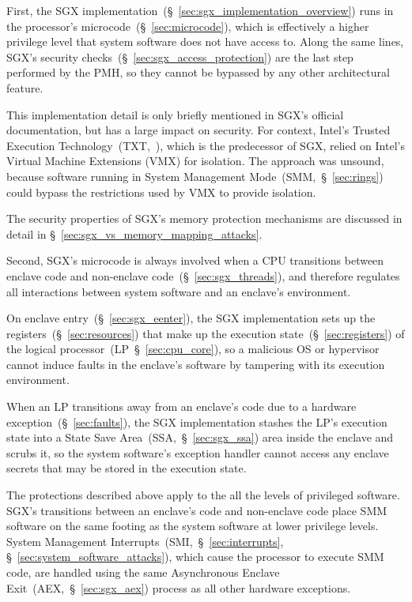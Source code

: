 First, the SGX implementation~(\S~\ref{sec:sgx_implementation_overview}) runs
in the processor's microcode~(\S~\ref{sec:microcode}), which is effectively a
higher privilege level that system software does not have access to.
Along the same lines, SGX's security
checks~(\S~\ref{sec:sgx_access_protection}) are the last step performed by the
PMH, so they cannot be bypassed by any other architectural feature.

This implementation detail is only briefly mentioned in SGX's official
documentation, but has a large impact on security. For context, Intel's Trusted
Execution Technology~(TXT,~\cite{grawrock2009txt}), which is the predecessor of
SGX, relied on Intel's Virtual Machine Extensions (VMX) for isolation. The
approach was unsound, because software running in System Management
Mode~(SMM,~\S~\ref{sec:rings}) could bypass the restrictions used by VMX to
provide isolation.

The security properties of SGX's memory protection mechanisms are discussed
in detail in \S~\ref{sec:sgx_vs_memory_mapping_attacks}.

Second, SGX's microcode is always involved when a CPU transitions between
enclave code and non-enclave code~(\S~\ref{sec:sgx_threads}), and therefore
regulates all interactions between system software and an enclave's
environment.

On enclave entry~(\S~\ref{sec:sgx_eenter}), the SGX implementation sets up the
registers~(\S~\ref{sec:resources}) that make up the execution
state~(\S~\ref{sec:registers}) of the logical
processor~(LP~\S~\ref{sec:cpu_core}), so a malicious OS or hypervisor cannot
induce faults in the enclave's software by tampering with its execution
environment.

When an LP transitions away from an enclave's code due to a
hardware exception~(\S~\ref{sec:faults}), the SGX implementation stashes the
LP's execution state into a State Save Area~(SSA,~\S~\ref{sec:sgx_ssa}) area
inside the enclave and scrubs it, so the system software's exception handler
cannot access any enclave secrets that may be stored in the execution state.

The protections described above apply to the all the levels of privileged
software. SGX's transitions between an enclave's code and non-enclave code
place SMM software on the same footing as the system software at lower
privilege levels. System Management Interrupts~(SMI,~\S~\ref{sec:interrupts},
\S~\ref{sec:system_software_attacks}), which cause the processor to execute
SMM code, are handled using the same Asynchronous Enclave
Exit~(AEX,~\S~\ref{sec:sgx_aex}) process as all other hardware exceptions.


